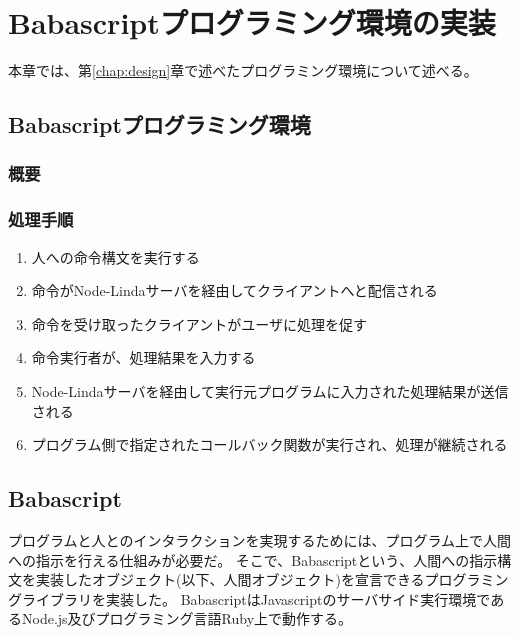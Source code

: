 \chapter{Babascriptプログラミング環境の実装}
\label{chap:implementation}

本章では、第\ref{chap:design}章で述べたプログラミング環境について述べる。

\section{Babascriptプログラミング環境}\label{babascriptux30d7ux30edux30b0ux30e9ux30dfux30f3ux30b0ux74b0ux5883}

\subsection{概要}\label{ux6982ux8981}

\subsection{処理手順}\label{ux51e6ux7406ux624bux9806}

\begin{enumerate}
\def\labelenumi{\arabic{enumi}.}
\itemsep1pt\parskip0pt
\item
  人への命令構文を実行する
\item
  命令がNode-Lindaサーバを経由してクライアントへと配信される
\item
  命令を受け取ったクライアントがユーザに処理を促す
\item
  命令実行者が、処理結果を入力する
\item
  Node-Lindaサーバを経由して実行元プログラムに入力された処理結果が送信される
\item
  プログラム側で指定されたコールバック関数が実行され、処理が継続される
\end{enumerate}

\section{Babascript}\label{babascript}

プログラムと人とのインタラクションを実現するためには、プログラム上で人間への指示を行える仕組みが必要だ。
そこで、Babascriptという、人間への指示構文を実装したオブジェクト(以下、人間オブジェクト)を宣言できるプログラミングライブラリを実装した。
BabascriptはJavascriptのサーバサイド実行環境であるNode.js及びプログラミング言語Ruby上で動作する。

